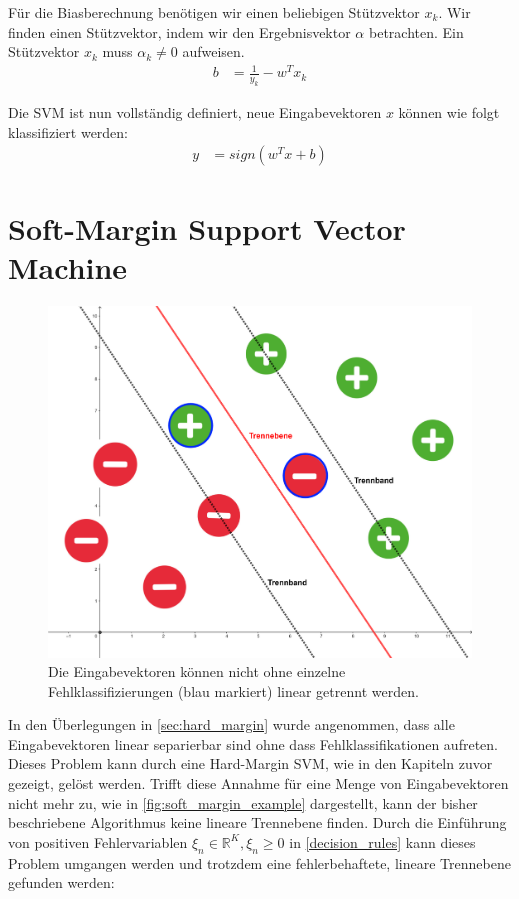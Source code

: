 \documentclass[a4paper,11pt,twoside]{scrreprt}
\begin{document}
Für die Biasberechnung benötigen wir einen beliebigen Stützvektor $x_{k}$. Wir finden einen Stützvektor, indem wir den Ergebnisvektor $\alpha$ betrachten. Ein Stützvektor $x_{k}$ muss $\alpha_{k} \neq 0$ aufweisen.
\begin{equation} \label{bias_calc_qp}
	\begin{aligned}
		b &= \frac{1}{y_{k}} - w^{T} x_{k}
	\end{aligned}
\end{equation}

Die \ac{SVM} ist nun vollständig definiert, neue Eingabevektoren $x$ können wie folgt klassifiziert werden:
\begin{equation} \label{svm_classify}
	\begin{aligned}
		y &= sign(w^{T} x + b)
	\end{aligned}
\end{equation}

\section{Soft-Margin Support Vector Machine} \label{sec:soft_margin}
\begin{figure}[H]
	\centering
	\includegraphics[width = 12cm]{assets/soft_margin_example.png}
	\caption{Die Eingabevektoren können nicht ohne einzelne Fehlklassifizierungen (blau markiert) linear getrennt werden.}
	\label{fig:soft_margin_example}
\end{figure}

In den Überlegungen in \autoref{sec:hard_margin} wurde angenommen, dass alle Eingabevektoren linear separierbar sind ohne dass Fehlklassifikationen aufreten. Dieses Problem kann durch eine Hard-Margin \ac{SVM}, wie in den Kapiteln zuvor gezeigt, gelöst werden. Trifft diese Annahme für eine Menge von Eingabevektoren nicht mehr zu, wie in \autoref{fig:soft_margin_example} dargestellt, kann der bisher beschriebene Algorithmus keine lineare Trennebene finden. Durch die Einführung von positiven Fehlervariablen $\xi_{n} \in \mathbb{R}^{K}, \xi_{n} \geq 0$ in \autoref{decision_rules} kann dieses Problem umgangen werden und trotzdem eine fehlerbehaftete, lineare Trennebene gefunden werden:
\end{document}
